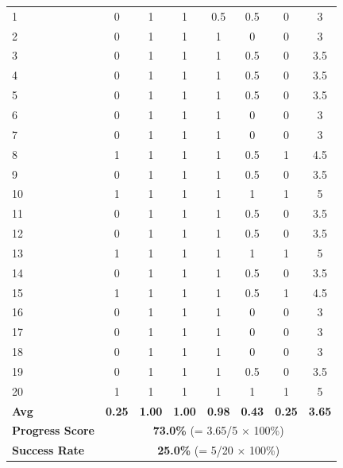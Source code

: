 \documentclass[onecolumn]{robbyant}           %
\begin{document}
\begin{table}[t]
\begin{tabular}{l|c|ccccc|c}
\midrule
1  & 0 & 1 & 1 & 0.5 & 0.5 & 0 & 3 \\
2  & 0 & 1 & 1 & 1 & 0 & 0 & 3 \\
3  & 0 & 1 & 1 & 1 & 0.5 & 0 & 3.5 \\
4  & 0 & 1 & 1 & 1 & 0.5 & 0 & 3.5 \\
5  & 0 & 1 & 1 & 1 & 0.5 & 0 & 3.5 \\
6  & 0 & 1 & 1 & 1 & 0 & 0 & 3 \\
7  & 0 & 1 & 1 & 1 & 0 & 0 & 3 \\
8  & 1 & 1 & 1 & 1 & 0.5 & 1 & 4.5 \\
9  & 0 & 1 & 1 & 1 & 0.5 & 0 & 3.5 \\
10 & 1 & 1 & 1 & 1 & 1 & 1 & 5 \\
11 & 0 & 1 & 1 & 1 & 0.5 & 0 & 3.5 \\
12 & 0 & 1 & 1 & 1 & 0.5 & 0 & 3.5 \\
13 & 1 & 1 & 1 & 1 & 1 & 1 & 5 \\
14 & 0 & 1 & 1 & 1 & 0.5 & 0 & 3.5 \\
15 & 1 & 1 & 1 & 1 & 0.5 & 1 & 4.5 \\
16 & 0 & 1 & 1 & 1 & 0 & 0 & 3 \\
17 & 0 & 1 & 1 & 1 & 0 & 0 & 3 \\
18 & 0 & 1 & 1 & 1 & 0 & 0 & 3 \\
19 & 0 & 1 & 1 & 1 & 0.5 & 0 & 3.5 \\
20 & 1 & 1 & 1 & 1 & 1 & 1 & 5 \\
\midrule
\textbf{Avg} & \textbf{0.25} & \textbf{1.00} & \textbf{1.00} & \textbf{0.98} & \textbf{0.43} & \textbf{0.25} & \textbf{3.65} \\
\textbf{Progress Score} & \multicolumn{7}{c}{\textbf{73.0\%} (= 3.65/5 $\times$ 100\%)} \\
\textbf{Success Rate} & \multicolumn{7}{c}{\textbf{25.0\%} (= 5/20 $\times$ 100\%)} \\
\bottomrule
\end{tabular}
\end{table}
\end{document}
